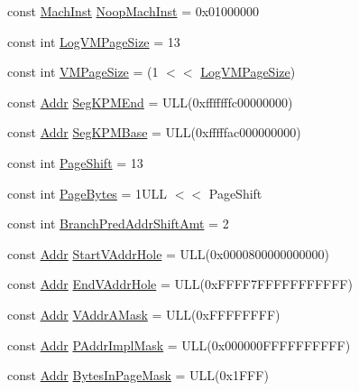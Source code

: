 \begin{DoxyCompactItemize}
\item 
const \hyperlink{namespaceSparcISA_a301c22ea09fa33dcfe6ddf22f203699c}{MachInst} \hyperlink{namespaceSparcISA_a636df3d1cbf44a747182aa98c4f89429}{NoopMachInst} = 0x01000000
\item 
const int \hyperlink{namespaceSparcISA_a554fef169d109a5ccb7ce0dd6a43e521}{LogVMPageSize} = 13
\item 
const int \hyperlink{namespaceSparcISA_a891eaf95159d764e6efae501c2860a3a}{VMPageSize} = (1 $<$$<$ \hyperlink{namespaceSparcISA_a554fef169d109a5ccb7ce0dd6a43e521}{LogVMPageSize})
\item 
const \hyperlink{base_2types_8hh_af1bb03d6a4ee096394a6749f0a169232}{Addr} \hyperlink{namespaceSparcISA_a63fc50b3e99f87e3eb05f5a8bd473ea4}{SegKPMEnd} = ULL(0xfffffffc00000000)
\item 
const \hyperlink{base_2types_8hh_af1bb03d6a4ee096394a6749f0a169232}{Addr} \hyperlink{namespaceSparcISA_a1b6320d4c0e7fb8b5cf9f28cef6681e0}{SegKPMBase} = ULL(0xfffffac000000000)
\item 
const int \hyperlink{namespaceSparcISA_a500ead3838797254da115aeeff14aaa5}{PageShift} = 13
\item 
const int \hyperlink{namespaceSparcISA_a7a804a2139c455999786dede70a4467b}{PageBytes} = 1ULL $<$$<$ PageShift
\item 
const int \hyperlink{namespaceSparcISA_a518c446960e93d236b89246eabc20298}{BranchPredAddrShiftAmt} = 2
\item 
const \hyperlink{base_2types_8hh_af1bb03d6a4ee096394a6749f0a169232}{Addr} \hyperlink{namespaceSparcISA_ab232c3f77d12da8f20157152adc977bd}{StartVAddrHole} = ULL(0x0000800000000000)
\item 
const \hyperlink{base_2types_8hh_af1bb03d6a4ee096394a6749f0a169232}{Addr} \hyperlink{namespaceSparcISA_a4d93696a5ef64a474d95daebd255181b}{EndVAddrHole} = ULL(0xFFFF7FFFFFFFFFFF)
\item 
const \hyperlink{base_2types_8hh_af1bb03d6a4ee096394a6749f0a169232}{Addr} \hyperlink{namespaceSparcISA_a23f8389b82b2ea7be78d3f123b91ec4c}{VAddrAMask} = ULL(0xFFFFFFFF)
\item 
const \hyperlink{base_2types_8hh_af1bb03d6a4ee096394a6749f0a169232}{Addr} \hyperlink{namespaceSparcISA_abb8b7685b079953e35015543262458e2}{PAddrImplMask} = ULL(0x000000FFFFFFFFFF)
\item 
const \hyperlink{base_2types_8hh_af1bb03d6a4ee096394a6749f0a169232}{Addr} \hyperlink{namespaceSparcISA_aa9425c8366e078ba79a7d9730ad25492}{BytesInPageMask} = ULL(0x1FFF)
\item 

\end{DoxyCompactItemize}
